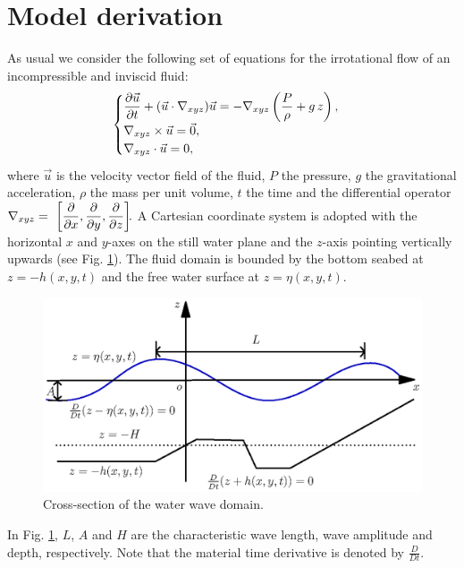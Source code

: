 
\section{Model derivation}
As usual  we consider the following set of
equations for the irrotational flow of an incompressible and inviscid fluid:
\begin{equation}\label{lopes:eq:euler}
\begin{cases}
\displaystyle\frac{\partial  \vec{u}}{\partial 
  t}+(\vec{u}\cdot\nabla_{xyz})\vec{u}=-\nabla_{xyz}\left(\frac{P}{\rho} +g\, z\right),\\
\nabla_{xyz}\times \vec{u}={\vec{0}},  \\
\nabla_{xyz}\cdot{\vec{u}}=0,
\end{cases}
\end{equation}
where \(\vec{u}\) is the  velocity vector field of the fluid, \(P\) the
pressure, \(g\) the gravitational acceleration, \(\rho\) the
mass per unit volume, \(t\) the time and the differential operator \(\displaystyle\nabla_{xyz}=~\left[\frac{\partial }{\partial x},\frac{\partial }{\partial y},\frac{\partial }{\partial z}\right]\!\!.\)
A Cartesian coordinate system is adopted with the
horizontal  \(x\) and \(y\)-axes on the still water plane and
the \(z\)-axis pointing vertically upwards 
(see Fig. \ref{lopes:fig:schematic}). The fluid domain is
bounded by the  bottom seabed at \(z=-h(x,y,t)\) and the free
water surface at \(z=\eta(x,y,t)\). 
\begin{figure}[!htb]
{\centering
\includegraphics[width=\largewidth]{chapters/lopes/eps/graph.eps}
\caption{Cross-section of the water wave domain.}\label{lopes:fig:schematic}
\par}
\end{figure} 
In Fig. \ref{lopes:fig:schematic}, \(L\), \(A\) and \(H\) are
the characteristic wave length, wave amplitude and
depth, respectively. Note that the material time derivative is
denoted by \(\frac{D}{D t}\). 
  
